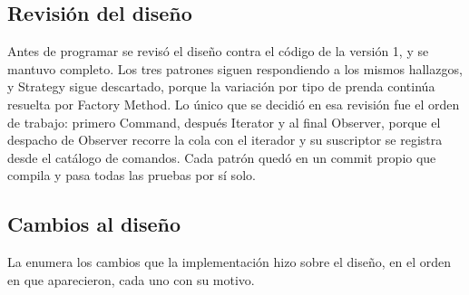 %
%

\subsection{Revisión del diseño}

Antes de programar se revisó el diseño contra el código de la versión 1, y se mantuvo completo. Los tres patrones siguen respondiendo a los mismos hallazgos, y Strategy sigue descartado, porque la variación por tipo de prenda continúa resuelta por Factory Method. Lo único que se decidió en esa revisión fue el orden de trabajo: primero Command, después Iterator y al final Observer, porque el despacho de Observer recorre la cola con el iterador y su suscriptor se registra desde el catálogo de comandos. Cada patrón quedó en un commit propio que compila y pasa todas las pruebas por sí solo.

\subsection{Cambios al diseño}

La  enumera los cambios que la implementación hizo sobre el diseño, en el orden en que aparecieron, cada uno con su motivo.

